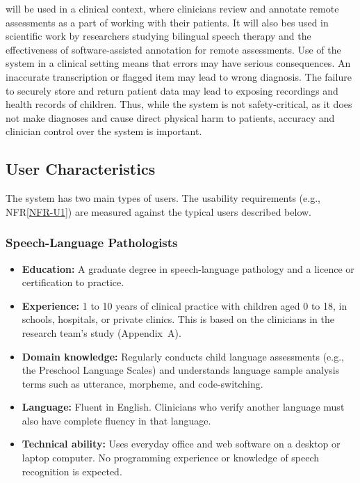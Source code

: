 \documentclass[12pt]{article}
\newcommand{\nfrref}[1]{NFR\ref{#1}}
\begin{document}
\progname{} will be used in a clinical context, where clinicians review and annotate
remote assessments as a part of working with their patients. It will also bes used in 
scientific work by researchers studying bilingual speech therapy and the effectiveness 
of software-assisted annotation for remote assessments.
Use of the system in a clinical setting means that errors may have serious consequences.
An inaccurate transcription or flagged item may lead to wrong diagnosis. The failure to 
securely store and return patient data may lead to exposing recordings and health records of children. Thus, while
the system is not safety-critical, as it does not make diagnoses and cause direct physical harm to patients, accuracy
and clinician control over the system is important.


\subsection{User Characteristics} \label{SecUserCharacteristics}

The system has two main types of users. The usability requirements (e.g., \nfrref{NFR-U1}) are measured against the typical users described below.

\subsubsection{Speech-Language Pathologists}
\begin{itemize}
  \item \textbf{Education:} A graduate degree in speech-language pathology and a licence or certification to practice.
  \item \textbf{Experience:} 1 to 10 years of clinical practice with children aged 0 to 18, in schools, hospitals, or private clinics. This is based on the clinicians in the research team’s study (Appendix~A).
  \item \textbf{Domain knowledge:} Regularly conducts child language assessments 
  (e.g., the Preschool Language Scales) and understands language sample analysis terms such as utterance, morpheme, and code-switching.
  \item \textbf{Language:} Fluent in English. Clinicians who verify another language must also have complete fluency in that language.
  \item \textbf{Technical ability:} Uses everyday office and web software on a desktop or laptop computer. No programming experience or knowledge of speech recognition is expected.
\end{itemize}
\end{document}
